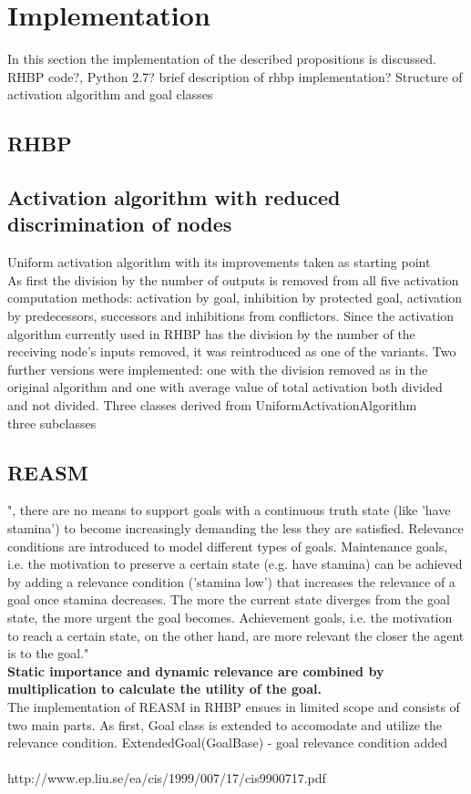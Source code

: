 \chapter{Implementation}
In this section the implementation of the described propositions is discussed.\\
RHBP code?, Python 2.7? brief description of rhbp implementation? Structure of activation algorithm and goal classes

\section{RHBP}

\section{Activation algorithm with reduced discrimination of nodes}
Uniform activation algorithm with its improvements taken as starting point \\
As first the division by the number of outputs is removed from all five activation computation methods: activation by goal, inhibition by protected goal, activation by predecessors, successors and inhibitions from conflictors.  Since the activation algorithm currently used in RHBP has the division by the number of the receiving node's inputs removed, it was reintroduced as one of the variants. Two further versions were implemented: one with the division removed as in the original algorithm and one with average value of total activation both divided and not divided.
Three classes derived from UniformActivationAlgorithm\\
three subclasses 
\label{stegotext}
\section{REASM}
", there are no means to support goals with a continuous truth state
(like ’have stamina’) to become increasingly demanding the less they are
satisfied. Relevance conditions are introduced to model different types of goals. Maintenance goals, i.e. the motivation to preserve a certain state (e.g. have
stamina) can be achieved by adding a relevance condition (’stamina low’)
that increases the relevance of a goal once stamina decreases. The more
the current state diverges from the goal state, the more urgent the goal becomes. Achievement goals, i.e. the motivation to reach a certain state, on
the other hand, are more relevant the closer the agent is to the goal."\\
\textbf{Static importance and dynamic relevance are combined by multiplication to
calculate the utility of the goal.}\\
The implementation of REASM in RHBP ensues in limited scope and consists of two main parts. As first, Goal class is extended to accomodate and utilize the relevance condition.
ExtendedGoal(GoalBase) - goal relevance condition added
\\\\
http://www.ep.liu.se/ea/cis/1999/007/17/cis9900717.pdf

